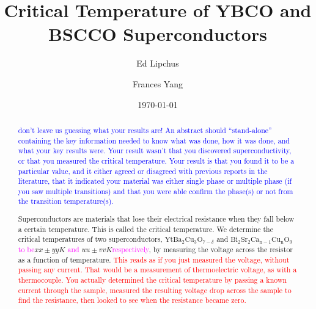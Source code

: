 \documentclass[prb,preprint]{revtex4-1}
\begin{document}

\title{Critical Temperature of YBCO and BSCCO Superconductors}

\author{Ed Lipchus}



\author{Frances Yang}


\date{\today}

\begin{abstract}

\textcolor{blue}{don't leave us guessing what your results are! An abstract should ``stand-alone'' containing the key information needed to know what was done, how it was done, and what your key results were. Your result wasn't that you discovered superconductivity, or that you measured the critical temperature. Your result is that you found it to be a particular value, and it either agreed or disagreed with previous reports in the literature, that it indicated your material was either single phase or multiple phase (if you saw multiple transitions) and that you were able confirm the phase(s) or not from the transition temperature(s).} 

Superconductors are materials that lose their electrical resistance  when they fall below a certain temperature. This is called the critical temperature. We determine the critical temperatures of two superconductors,  $\textrm{Yt}\textrm{Ba}_{2}\textrm{Cu}_{3}\textrm{O}_{7-\delta}$ and $\textrm{Bi}_{2}\textrm{Sr}_{2}\textrm{Ca}_{\textrm{n}-1}\textrm{Cu}_{\textrm{n}}\textrm{O}_{9}$ \textcolor{magenta}{to be}$xx \pm yy K$ \textcolor{magenta}{and} $uu \pm vv K$\textcolor{magenta}{respectively}, by measuring the voltage across the resistor as a function of temperature. \textcolor{red}{This reads as if you just measured the voltage, without passing any current. That would be a measurement of thermoelectric voltage, as with a thermocouple. You actually determined the critical temperature by passing a known current through the sample, measured the resulting voltage drop across the sample to find the resistance, then looked to see when the resistance became zero. }



\end{abstract}
\end{document}

